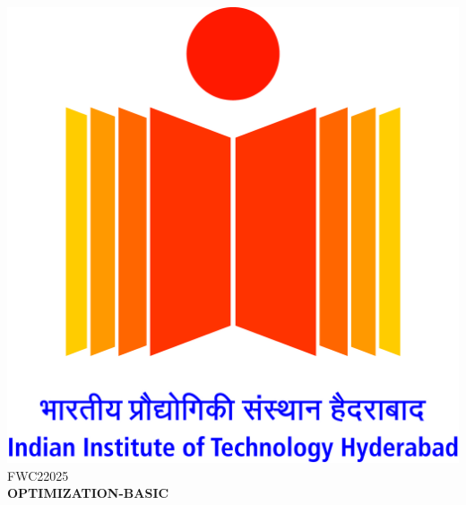 \documentclass[a4paper,10pt]{report}
\begin{document}
\raggedright{\includegraphics[scale=0.07]{logo.jpg}}\hspace{12.425cm}\raggedleft FWC22025\vspace{2mm}\\
\centering\Large\textbf{OPTIMIZATION-BASIC}\vspace{5mm}
\end{document}
